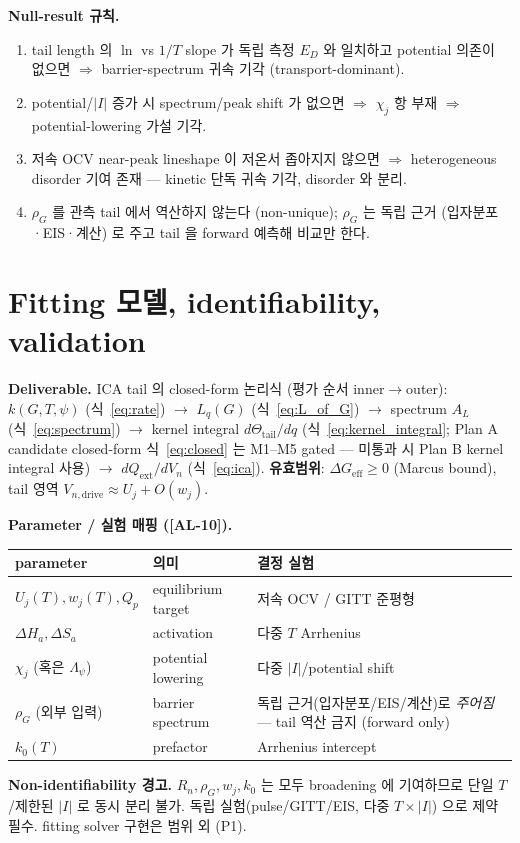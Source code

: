 \documentclass[11pt,a4paper]{article}
\newcommand{\eff}{\mathrm{eff}}
\newcommand{\dimedrive}{\mathrm{drive}}
\newcommand{\ext}{\mathrm{ext}}
\newcommand{\AL}[1]{\textsf{[AL-#1]}}
\begin{document}
\textbf{Null-result 규칙.}
\begin{enumerate}[label=(N\arabic*)]
\item tail length 의 $\ln$ vs $1/T$ slope 가 독립 측정 $E_D$ 와 일치하고 potential 의존이
  없으면 $\Rightarrow$ barrier-spectrum 귀속 기각 (transport-dominant).
\item potential/$|I|$ 증가 시 spectrum/peak shift 가 없으면 $\Rightarrow$ $\chi_j$ 항 부재
  $\Rightarrow$ potential-lowering 가설 기각.
\item 저속 OCV near-peak lineshape 이 저온서 좁아지지 않으면 $\Rightarrow$ heterogeneous
  disorder 기여 존재 — kinetic 단독 귀속 기각, disorder 와 분리.
\item $\rho_G$ 를 관측 tail 에서 역산하지 않는다 (non-unique); $\rho_G$ 는 독립 근거
  (입자분포·EIS·계산) 로 주고 tail 을 forward 예측해 비교만 한다.
\end{enumerate}

\section{Fitting 모델, identifiability, validation}\label{sec:fitting}
\textbf{Deliverable.} ICA tail 의 closed-form 논리식 (평가 순서 inner$\to$outer):
$k(G,T,\psi)$ (식~\eqref{eq:rate}) $\to$ $L_q(G)$ (식~\eqref{eq:L_of_G}) $\to$ spectrum
$A_L$ (식~\eqref{eq:spectrum}) $\to$ kernel integral $d\Theta_\mathrm{tail}/dq$
(식~\eqref{eq:kernel_integral}; Plan A candidate closed-form 식~\eqref{eq:closed} 는 M1--M5
gated — 미통과 시 Plan B kernel integral 사용) $\to$ $dQ_\ext/dV_n$
(식~\eqref{eq:ica}). \textbf{유효범위}: $\Delta G_\eff\ge0$ (Marcus bound), tail 영역
$V_{n,\dimedrive}\approx U_j+O(w_j)$.

\textbf{Parameter / 실험 매핑 (\AL{10}).}
\begin{longtable}{p{} p{} p{}}
\toprule parameter & 의미 & 결정 실험 \\ \midrule \endhead
$U_j(T),w_j(T),Q_p$ & equilibrium target & 저속 OCV / GITT 준평형 \\
$\Delta H_a,\Delta S_a$ & activation & 다중 $T$ Arrhenius \\
$\chi_j$ (혹은 $\Lambda_\psi$) & potential lowering & 다중 $|I|$/potential shift \\
$\rho_G$ (외부 입력) & barrier spectrum & 독립 근거(입자분포/EIS/계산)로 \emph{주어짐} — tail 역산 금지 (forward only) \\
$k_0(T)$ & prefactor & Arrhenius intercept \\
\bottomrule
\end{longtable}
\textbf{Non-identifiability 경고.} $R_n,\rho_G,w_j,k_0$ 는 모두 broadening 에 기여하므로
단일 $T$/제한된 $|I|$ 로 동시 분리 불가. 독립 실험(pulse/GITT/EIS, 다중 $T\times|I|$) 으로
제약 필수. fitting solver 구현은 범위 외 (P1).
\end{document}
